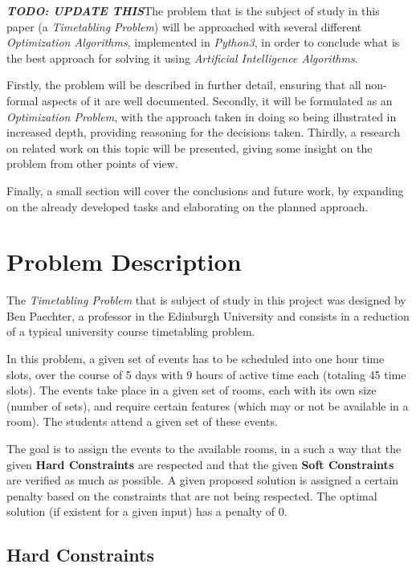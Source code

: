\documentclass[conference]{IEEEtran}
\begin{document}
\textbf{\textit{TODO: UPDATE THIS}}The problem that is the subject of study in this paper (a \textit{Timetabling Problem}) will be approached with several different \textit{Optimization Algorithms}, implemented in \textit{Python3}, in order to conclude what is the best approach for solving it using \textit{Artificial Intelligence Algorithms}.

Firstly, the problem will be described in further detail, ensuring that all non-formal aspects of it are well documented. Secondly, it will be formulated as an \textit{Optimization Problem}, with the approach taken in doing so being illustrated in increased depth, providing reasoning for the decisions taken. Thirdly, a research on related work on this topic will be presented, giving some insight on the problem from other points of view.

Finally, a small section will cover the conclusions and future work, by expanding on the already developed tasks and elaborating on the planned approach.

\section{Problem Description}

The \textit{Timetabling Problem} that is subject of study in this project was designed by Ben Paechter, a professor in the Edinburgh University and consists in a reduction of a typical university course timetabling problem.

In this problem, a given set of events has to be scheduled into one hour time slots, over the course of 5 days with 9 hours of active time each (totaling 45 time slots). The events take place in a given set of rooms, each with its own size (number of sets), and require certain features (which may or not be available in a room). The students attend a given set of these events. 

The goal is to assign the events to the available rooms, in a such a way that the given \textbf{Hard Constraints} are respected and that the given \textbf{Soft Constraints} are verified as much as possible. A given proposed solution is assigned a certain penalty based on the constraints that are not being respected. The optimal solution (if existent for a given input) has a penalty of 0.

\subsection{Hard Constraints}
\end{document}

